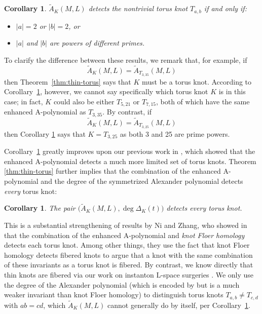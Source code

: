 \documentclass[11pt]{amsart}
\newtheorem {corollary}[theorem]{Corollary}
\numberwithin{equation}{section}
\numberwithin{theorem}{section}
\theoremstyle{definition}
\begin{document}
\begin{corollary}
\label{cor:detectionA}
 $\tilde{A}_K(M,L)$ detects the nontrivial torus knot $T_{a,b}$ if and only if:
\begin{itemize}
\item $|a|=2$ or $|b|=2$, or 
\item $|a|$ and $|b|$ are powers of different primes.\end{itemize} 
\end{corollary}

To clarify the difference between these results, we remark that, for example, if \[\tilde{A}_K(M,L) = \tilde{A}_{T_{3,35}}(M,L)\] then Theorem~\ref{thm:thin-torus} says that $K$ must be a torus knot.  According to Corollary~\ref{cor:detectionA}, however, we cannot say specifically which torus knot $K$ is in this case; in fact, $K$ could also be either $T_{5,21}$ or $T_{7,15}$, both of which have the same enhanced A-polynomial as $T_{3,35}$. By contrast, if \[\tilde{A}_K(M,L) = \tilde{A}_{T_{3,25}}(M,L)\] then Corollary \ref{cor:detectionA} says that $K = T_{3,25}$ as both 3 and 25 are prime powers.

Corollary~\ref{cor:detectionA} greatly improves upon our previous work in \cite[Corollary~10.16]{bs-lspace}, which showed that the enhanced A-polynomial detects a much more limited set of torus knots.
Theorem \ref{thm:thin-torus} further implies that the combination of the enhanced A-polynomial and the degree of the symmetrized Alexander polynomial detects \emph{every} torus knot:

\begin{corollary}
\label{cor:detectionAdeg}
 The pair $\big(\tilde{A}_K(M,L), \deg \Delta_K(t)\big)$ detects every torus knot. 
\end{corollary}

This is a substantial strengthening of results by Ni and Zhang, who showed in \cite{ni-zhang} that the combination of the enhanced A-polynomial and \emph{knot Floer homology} detects each torus knot. Among other things, they use the fact that knot Floer homology detects fibered knots to argue that a knot with the same combination of these invariants as a torus knot is fibered. By contrast, we know directly that thin knots are fibered via our work on instanton L-space surgeries \cite{bs-lspace}. We only use the degree of the Alexander polynomial (which is encoded by but is a much weaker invariant than knot Floer homology) to distinguish torus knots $T_{a,b} \neq T_{c,d}$ with $ab=cd$, which $\tilde{A}_K(M,L)$ cannot generally do by itself, per Corollary~\ref{cor:detectionA}.
\end{document}
